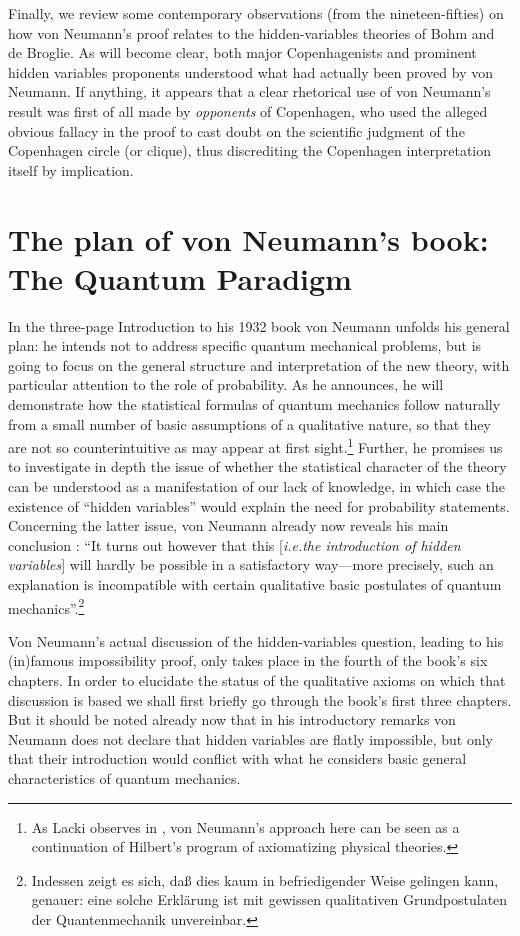 \documentclass[11pt]{article}
\begin{document}
Finally, we review some contemporary observations (from the nineteen-fifties) on how von Neumann's proof relates to the hidden-variables theories of Bohm and de Broglie. As will become clear, both major Copenhagenists and prominent hidden variables proponents understood what had actually been proved by von Neumann. If anything, it appears that a clear rhetorical use of von Neumann's result was first of all made by \emph{opponents} of Copenhagen, who used the alleged obvious fallacy in the proof to cast doubt on the scientific judgment of the Copenhagen circle (or clique), thus discrediting the Copenhagen interpretation itself by implication.


\section{The plan of von Neumann's book: The Quantum Paradigm}\label{book}

In the three-page Introduction to his 1932 book von Neumann unfolds his general plan: he intends not to address specific quantum mechanical problems, but is going to focus on the general structure and interpretation of the new theory, with particular attention to the role of probability. As he announces, he will demonstrate how the statistical formulas of quantum mechanics follow naturally from a small number of basic assumptions of a qualitative nature, so that they are not so counterintuitive as may appear at first sight.\footnote{As Lacki observes in \cite{lacki}, von Neumann's approach here can be seen as a continuation of Hilbert's program of axiomatizing physical theories.}  Further, he promises us to investigate in depth the issue of whether the statistical character of the theory can be understood as a manifestation of our lack of knowledge, in which case the existence of ``hidden variables'' would explain the need for probability statements. Concerning the latter issue, von Neumann already now reveals his main conclusion \cite[pp.\@ 2--3]{VN1}: ``It turns out however that this [\emph{i.e.\@ the introduction of hidden variables}] will hardly be possible in a satisfactory way---more precisely, such an explanation is incompatible with certain qualitative basic postulates of quantum mechanics''.\footnote{Indessen zeigt es sich, da{\ss} dies kaum in befriedigender Weise gelingen kann, genauer: eine solche Erkl\"{a}rung ist mit gewissen qualitativen Grundpostulaten der Quantenmechanik unvereinbar.}

Von Neumann's actual discussion of the hidden-variables question, leading to his (in)famous impossibility proof, only takes place in the fourth of the book's six chapters. In order to elucidate the status of the qualitative axioms on which that discussion is based we shall first briefly go through the book's first three chapters. But it should be noted already now that in his introductory remarks von Neumann does not declare that hidden variables are flatly impossible, but only that their introduction would conflict with what he considers basic general characteristics of quantum mechanics.
\end{document}

